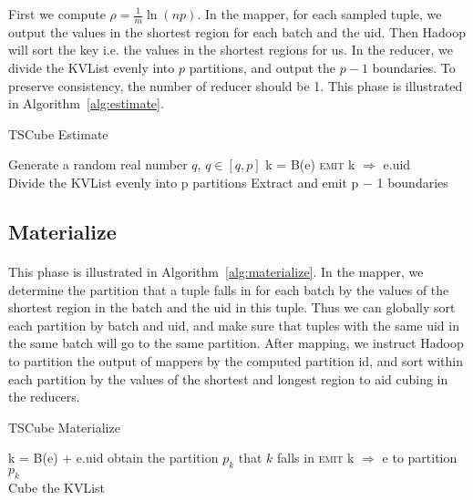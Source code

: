 \documentclass{article}
\begin{document}
First we compute $\rho=\frac{1}{m}\ln(np)$. In the mapper, for each sampled tuple, we output the values in the shortest region for each batch and the uid. Then Hadoop will sort the key i.e. the values in the shortest regions for us. In the reducer, we divide the KVList evenly into $p$ partitions, and output the $p - 1$ boundaries. To preserve consistency, the number of reducer should be 1. This phase is illustrated in Algorithm~\ref{alg:estimate}.

\begin{algorithm}[h]
\centering
\caption{TSCube Estimate}
\label{alg:estimate}
  \begin{algorithmic}[1]
      	\State Generate a random real number $q$, $q \in [q,p]$
      			\State k = B(e) 
      			\State \textsc{emit} k $\Rightarrow$ e.uid
      		\EndFor
      	\EndIf
      \EndFor
    \EndFunction
\\
      \State Divide the KVList evenly into p partitions
      \State Extract and emit p − 1 boundaries
    \EndFunction
  \end{algorithmic}
\end{algorithm}


\subsection{Materialize}

\paragraph{}
This phase is illustrated in Algorithm~\ref{alg:materialize}. In the mapper, we determine the partition that a tuple falls in for each batch by the values of the shortest region in the batch and the uid in this tuple. Thus we can globally sort each partition by batch and uid, and make sure that tuples with the same uid in the same batch will go to the same partition. After mapping, we instruct Hadoop to partition the output of mappers by the computed partition id, and sort within each partition by the values of the shortest and longest region to aid cubing in the reducers. 

\begin{algorithm}[h]
\centering
\caption{TSCube Materialize}
\label{alg:materialize}
  \begin{algorithmic}[1]
      			\State k = B(e) + e.uid
      			\State obtain the partition $p_{k}$ that $k$ falls in
      			\State \textsc{emit} k $\Rightarrow$ e to partition $p_{k}$
      		\EndFor
      \EndFor
    \EndFunction
\\
      \State Cube the KVList
    \EndFunction
  \end{algorithmic}
\end{algorithm}
\end{document}
